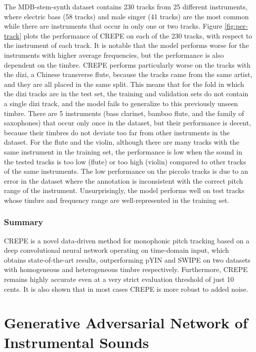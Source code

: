 The MDB-stem-synth dataset contains 230 tracks from 25 different instruments, where electric bass (58 tracks) and male singer (41 tracks) are the most common while there are instruments that occur in only one or two tracks.
Figure \ref{fig:per-track} plots the performance of CREPE on each of the 230 tracks, with respect to the instrument of each track.
It is notable that the model performs worse for the instruments with higher average frequencies, but the performance is also dependent on the timbre.
CREPE performs particularly worse on the tracks with the dizi, a Chinese transverse flute, because the tracks came from the same artist, and they are all placed in the same split.
This means that for the fold in which the dizi tracks are in the test set, the training and validation sets do not contain a single dizi track, and the model fails to generalize to this previously unseen timbre.
There are 5 instruments (bass clarinet, bamboo flute, and the family of saxophones) that occur only once in the dataset, but their performance is decent, because their timbres do not deviate too far from other instruments in the dataset.
For the flute and the violin, although there are many tracks with the same instrument in the training set, the performance is low when the sound in the tested tracks is too low (flute) or too high (violin) compared to other tracks of the same instruments.
The low performance on the piccolo tracks is due to an error in the dataset where the annotation is inconsistent with the correct pitch range of the instrument.
Unsurprisingly, the model performs well on test tracks whose timbre and frequency range are well-represented in the training set.

\subsubsection{Summary}

CREPE is a novel data-driven method for monophonic pitch tracking based on a deep convolutional neural network operating on time-domain input, which
obtains state-of-the-art results, outperforming pYIN and SWIPE on two datasets with homogeneous and heterogeneous timbre respectively.
Furthermore, CREPE remains highly accurate even at a very strict evaluation threshold of just 10 cents.
It is also shown that in most cases CREPE is more robust to added noise.


\section{Generative Adversarial Network of Instrumental Sounds}

